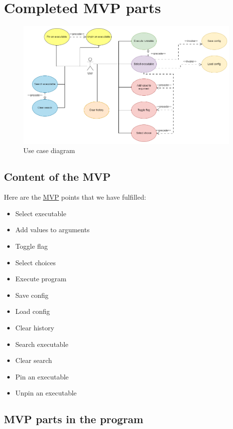 \documentclass{article}
\begin{document}
\section{Completed MVP parts}

\begin{figure}[h]
    \centering
    \includegraphics[width=1\linewidth]{img/use_case_diagram.drawio.png}
    \caption{Use case diagram}
    \label{fig:enter-label}
\end{figure}

\subsection{Content of the MVP}
Here are the \href{https://github.com/CsullogBeni/szofttech/blob/main/documentation/mvp.pdf}{MVP} points that we have fulfilled:
\begin{itemize}
    \item Select executable
    \item Add values to arguments
    \item Toggle flag
    \item Select choices
    \item Execute program
    \item Save config
    \item Load config
    \item Clear history
    \item Search executable
    \item Clear search
    \item Pin an executable
    \item Unpin an executable
\end{itemize}

\subsection{MVP parts in the program}
\end{document}
